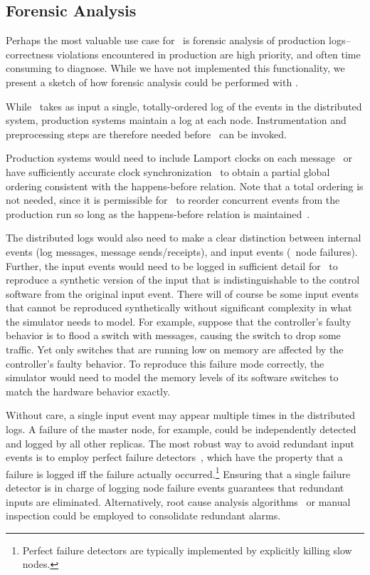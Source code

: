 \subsection{Forensic Analysis}

Perhaps the most valuable use case for \simulator~is forensic analysis of
production logs--correctness violations encountered in production are
high priority, and often time consuming to diagnose. While we have not
implemented this functionality, we present a sketch of
how forensic analysis could be performed with \simulator.

While \simulator~takes as input a single, totally-ordered log of the events in the
distributed system, production systems maintain a log at each node.
Instrumentation and preprocessing steps are therefore needed before \simulator~can be
invoked.

Production systems would need to include Lamport
clocks on each message~\cite{Lamport:1978:TCO:359545.359563} or have
sufficiently accurate clock
synchronization~\cite{corbett2012spanner} to obtain a partial global ordering
consistent with the happens-before relation.
Note that a total ordering is not needed, since it is permissible
for \simulator~to reorder concurrent events from
the production run so long as the happens-before relation is
maintained~\cite{Fischer:1985:IDC:3149.214121}.

The distributed logs would also need to make a clear distinction between internal events
(log messages, message sends/receipts), and input events (\eg~node failures). Further,
the input events would need to be logged in sufficient detail for \simulator~to
reproduce a synthetic version of the input that is indistinguishable to the control software
from the original input event. There will of course be some input events that cannot be reproduced
synthetically without significant complexity in what the simulator needs to model.
For example, suppose that the controller's faulty behavior is to flood a switch with messages,
causing the switch to drop some traffic. Yet only switches that are running low on memory
are affected by the controller's faulty behavior. To reproduce this failure mode correctly,
the simulator would need to model the memory levels of its software switches to match the
hardware behavior exactly.

Without care, a single input event may appear multiple times in the
distributed logs. A failure of the master node, for example, could be independently
detected and logged by all other replicas. The most robust way to
avoid redundant input events is to employ perfect failure
detectors~\cite{chandra1996unreliable}, which have the property that a
failure is logged iff
the failure actually occurred.\footnote{Perfect failure detectors are
typically implemented by explicitly killing slow
nodes.} Ensuring that a single failure detector is in charge of logging node failure
events guarantees that redundant inputs are eliminated. Alternatively, root cause analysis
algorithms~\cite{yemini1996} or manual inspection could be employed to consolidate redundant
alarms.

